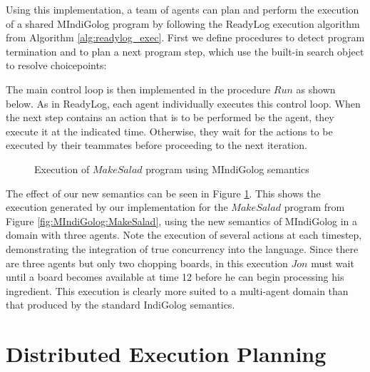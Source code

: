 
Using this implementation, a team of agents can plan and perform the
execution of a shared MIndiGolog program by following the ReadyLog
execution algorithm from Algorithm \ref{alg:readylog_exec}. First
we define procedures to detect program termination and to plan a next
program step, which use the built-in search object to resolve choicepoints:


The main control loop is then implemented in the procedure $Run$
as shown below. As in ReadyLog, each agent individually executes this
control loop. When the next step contains an action that is to be
performed be the agent, they execute it at the indicated time. Otherwise,
they wait for the actions to be executed by their teammates before
proceeding to the next iteration.


%
\begin{figure}[!b]

\caption{Execution of $MakeSalad$ program using MIndiGolog semantics\label{fig:MIndiGolog:MakeSalad-in-MIndiGolog}}

\end{figure}


The effect of our new semantics can be seen in Figure \ref{fig:MIndiGolog:MakeSalad-in-MIndiGolog}.
This shows the execution generated by our implementation for the $MakeSalad$
program from Figure \ref{fig:MIndiGolog:MakeSalad}, using the new
semantics of MIndiGolog in a domain with three agents. Note the execution
of several actions at each timestep, demonstrating the integration
of true concurrency into the language. Since there are three agents
but only two chopping boards, in this execution $Jon$ must wait until
a board becomes available at time 12 before he can begin processing
his ingredient. This execution is clearly more suited to a multi-agent
domain than that produced by the standard IndiGolog semantics.


\section{Distributed Execution Planning\label{sec:MIndiGolog:Distributed-Planning}}

